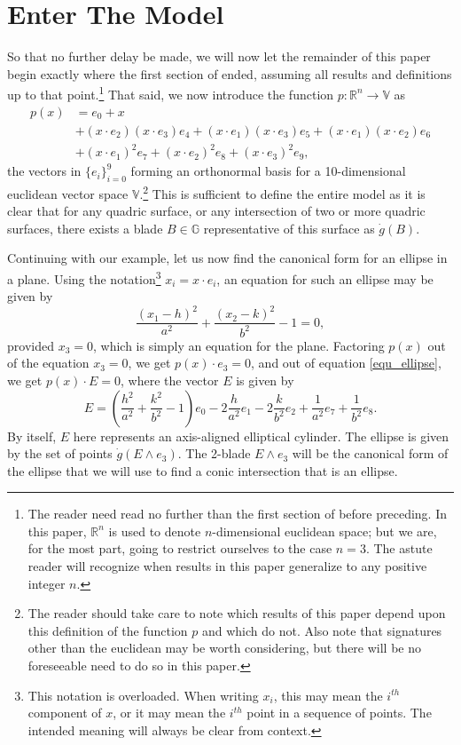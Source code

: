 \documentclass{birkjour}
\theoremstyle{definition}
\theoremstyle{remark}
\numberwithin{equation}{section}
\newcommand{\R}{\mathbb{R}}
\newcommand{\G}{\mathbb{G}}
\newcommand{\V}{\mathbb{V}}
\newcommand{\gd}{\dot{g}}
\begin{document}
\section{Enter The Model}

So that no further delay be made, we will now let the remainder of this paper begin
exactly where the first section of \cite{Parkin13} ended, assuming all results and definitions up to that point.\footnote{The
reader need read no further than the first section of \cite{Parkin13} before preceding.  In this paper, $\R^n$ is used to
denote $n$-dimensional euclidean space; but we are, for the most part, going to restrict ourselves to the case $n=3$.
The astute reader will recognize when results in this paper generalize to any positive integer $n$.}
That said, we now introduce the function $p:\R^n\to\V$ as
\begin{align*}
p(x) &= e_0 + x \\
 &+ (x\cdot e_2)(x\cdot e_3)e_4 + (x\cdot e_1)(x\cdot e_3)e_5 + (x\cdot e_1)(x\cdot e_2)e_6 \\
 &+ (x\cdot e_1)^2e_7 + (x\cdot e_2)^2e_8 + (x\cdot e_3)^2 e_9,
\end{align*}
the vectors in $\{e_i\}_{i=0}^9$ forming an orthonormal basis for a 10-dimensional
euclidean vector space $\V$.\footnote{The reader should take care to note which results of this paper
depend upon this definition of the function $p$ and which do not.  Also note that signatures
other than the euclidean may be worth considering, but there will be no foreseeable need to do so in this paper.}
This is sufficient to define the entire model as it is clear that for any quadric
surface, or any intersection of two or more quadric surfaces, there exists a blade
$B\in\G$ representative of this surface as $\gd(B)$.

Continuing with our example, let us now find the canonical form for an ellipse
in a plane.  Using the notation\footnote{This notation is overloaded.  When writing $x_i$, this may mean
the $i^{th}$ component of $x$, or it may mean the $i^{th}$ point in a sequence of points.  The intended
meaning will always be clear from context.} $x_i = x\cdot e_i$, an equation for such an ellipse
may be given by
\begin{equation}\label{equ_ellipse}
\frac{(x_1-h)^2}{a^2} + \frac{(x_2-k)^2}{b^2} - 1 = 0,
\end{equation}
provided $x_3=0$, which is simply an equation for the plane.
Factoring $p(x)$ out of the equation $x_3=0$, we get $p(x)\cdot e_3=0$,
and out of equation \eqref{equ_ellipse}, we get $p(x)\cdot E=0$, where the
vector $E$ is given by
\begin{equation*}
E = \left(\frac{h^2}{a^2}+\frac{k^2}{b^2} - 1\right)e_0 -
  2\frac{h}{a^2}e_1 - 2\frac{k}{b^2}e_2 + \frac{1}{a^2}e_7 + \frac{1}{b^2}e_8.
\end{equation*}
By itself, $E$ here represents an axis-aligned elliptical cylinder.  The ellipse is given by
the set of points $\gd(E\wedge e_3)$.  The 2-blade $E\wedge e_3$ will be the
canonical form of the ellipse that we will use to find a conic intersection that
is an ellipse.
\end{document}
